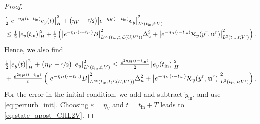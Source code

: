 \documentclass{m2an}
\newcommand{\bu}{\mathbf{u}}
\newcommand{\reduce}[1]{{{#1}^r}}
\newcommand{\tint}{t_{\mathrm{in}}}
\newcommand{\tildeyint}{\tilde y_{\mathrm{in}}}
\newcommand{\calL}{\mathcal{L}}
\newcommand{\calR}{\mathcal{R}}
\newcommand{\Res}{\calR}%
\newcommand{\norm}[2]{\left|#1\right|_{#2}}
\begin{document}
\begin{proof}
\begin{align}
        &\tfrac{1}{2}{\big|e^{-\eta_H (t-\tint)}e_y(t)\big|}_{H}^2+\big(\eta_V-\nicefrac{\varepsilon}{2}\big){\big|e^{-\eta_H (\cdot-\tint) }e_y\big|}_{L^2(\tint,t;V)}^2\\
        &\leq \tfrac{1}{2}\norm{e_y(\tint)}{H}^2 + \tfrac{1}{\varepsilon}\left({\big|e^{-\eta_H (\cdot-\tint) }B\big|}_{L^\infty(\tint,t;\calL(U,V'))}^2\Delta_u^2+ {\big|e^{-\eta_H (\cdot-\tint) }\Res_y(\reduce y, \reduce \bu)\big|}_{L^2(\tint,t;V')}^2\right). 
        \nonumber %
    \end{align}
    Hence, we also find
    \begin{align*}
        &\tfrac{1}{2}{\big|}e_y(t)\big|_H^2+\big(\eta_V-\nicefrac{\varepsilon}{2}\big)\norm{e_y}{L^2(\tint,t;V)}^2\leq \tfrac{e^{2\eta_H (t-\tint)}}{2}\norm{e_y(\tint)}{H}^2\\
        &+ \tfrac{e^{2\eta_H (t-\tint)}}{\varepsilon}\left( {\big|e^{-\eta_H (\cdot-\tint) }B\big|}_{L^\infty(\tint,t;\calL(U,V'))}^2\Delta_u^2 +{\big|e^{-\eta_H (\cdot-\tint) }\Res_y(\reduce y, \reduce \bu)\big|}_{L^2(\tint,t;V')}^2\right).
    \end{align*}
    For the error in the initial condition, we add and subtract $\tildeyint$, and use \eqref{eq:perturb_init}.
    Choosing $\varepsilon= \eta_V$ and $t=\tint+T$ leads to \eqref{eq:state_apost_CHL2V}. %
\end{proof}
%
\end{document}
